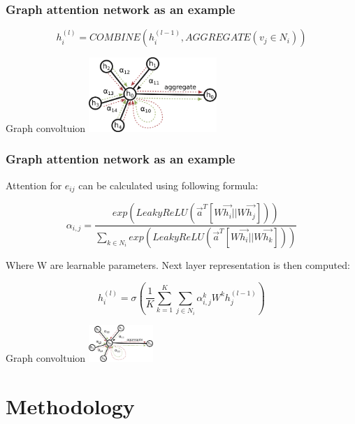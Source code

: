 \documentclass[10pt]{beamer}
\begin{document}
\begin{frame}
    \frametitle{Graph attention network as an example}
    \begin{equation}
        h_i^{(l)}=COMBINE(h_i^{(l-1)}, AGGREGATE(v_j\in N_i))
    \end{equation}
    \begin{block}{Graph convoltuion}
        \centering
        \includegraphics[height=80pt]{figure/attention.png}
    \end{block}
\end{frame}


\begin{frame}
    \frametitle{Graph attention network as an example}
    Attention for $e_{ij}$ can be calculated using following formula:

    \begin{equation}
        \alpha_{i,j}=\dfrac{exp(LeakyReLU(\vec{a}^T[W\vec{h_i}||W\vec{h_j}]))}{\sum_{k\in N_i}exp(LeakyReLU(\vec{a}^T[W\vec{h_i}||W\vec{h_k}]))}
    \end{equation}

    Where W are learnable parameters. Next layer representation is then computed:

    \begin{equation}
        h_i^{(l)}=\sigma(\dfrac{1}{K}\sum_{k=1}^{K}\sum_{j\in N_i}{\alpha^k_{i,j}W^kh^{(l-1)}_j})
    \end{equation}

    \begin{block}{Graph convoltuion}
        \centering
        \includegraphics[height=40pt]{figure/attention.png}
    \end{block}
\end{frame}


\section{Methodology}
\end{document}
